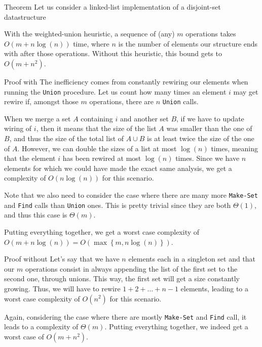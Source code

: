 \documentclass[a4paper]{article}
\begin{document}
\begin{parag}{Theorem}
    Let us consider a linked-list implementation of a disjoint-set datastructure

    With the weighted-union heuristic, a sequence of (any) $m$ operations takes $O\left(m + n\log\left(n\right)\right)$ time, where $n$ is the number of elements our structure ends with after those operations. Without this heuristic, this bound gets to $O\left(m + n^2\right)$.

    \begin{subparag}{Proof with}
        The inefficiency comes from constantly rewiring our elements when running the \texttt{Union} procedure. Let us count how many times an element $i$ may get rewire if, amongst those $m$ operations, there are $n$ \texttt{Union} calls.

        When we merge a set $A$ containing $i$ and another set $B$, if we have to update wiring of $i$, then it means that the size of the list $A$ was smaller than the one of $B$, and thus the size of the total list of $A \cup B$ is at least twice the size of the one of $A$. However, we can double the sizes of a list at most $\log\left(n\right)$ times, meaning that the element $i$ has been rewired at most $\log\left(n\right)$ times. Since we have $n$ elements for which we could have made the exact same analysis, we get a complexity of $O\left(n\log\left(n\right)\right)$ for this scenario.

        Note that we also need to consider the case where there are many more \texttt{Make-Set} and \texttt{Find} calls than \texttt{Union} ones. This is pretty trivial since they are both $\Theta\left(1\right)$, and thus this case is $\Theta\left(m\right)$.

        Putting everything together, we get a worst case complexity of $O\left(m + n\log\left(n\right)\right) = O\left(\max\left\{m, n\log\left(n\right)\right\}\right)$.
    \end{subparag}
    
    \begin{subparag}{Proof without}
        Let's say that we have $n$ elements each in a singleton set and that our $m$ operations consist in always appending the list of the first set to the second one, through unions. This way, the first set will get a size constantly growing. Thus, we will have to rewire $1 + 2 + \ldots + n-1$ elements, leading to a worst case complexity of $O\left(n^2\right)$ for this scenario.

        Again, considering the case where there are mostly \texttt{Make-Set} and \texttt{Find} call, it leads to a complexity of $\Theta\left(m\right)$. Putting everything together, we indeed get a worst case of $O\left(m + n^2\right)$.


\end{subparag}
\end{parag}
\end{document}
